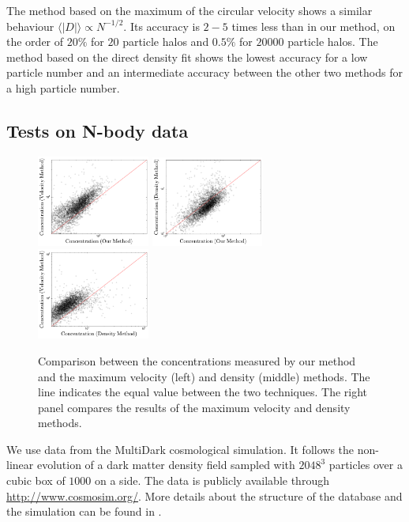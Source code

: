 \documentclass{emulateapj}
\newcommand{\avg}[1]{\langle{#1}\rangle}
\newcommand{\hMpc}{{\ifmmode{h^{-1}{\rm Mpc}}\else{$h^{-1}$Mpc }\fi}}
\begin{document}
The method based on the maximum of the circular velocity shows a similar
behaviour $\avg{|D|}\propto N^{-1/2}$. Its accuracy is $2-5$ times less
than in our method, on the order of $20\%$ for $20$ particle halos and
$0.5\%$ for $20000$ particle halos. The method based on the direct density
fit shows the lowest accuracy for a low particle number and an intermediate
accuracy between the other two methods for a high particle number.

\subsection{Tests on N-body data}
\label{sec:data}
\begin{figure}
  \begin{center}
    \includegraphics[width=0.33\textwidth]{mass-velocity.pdf}
    \includegraphics[width=0.33\textwidth]{mass-density.pdf}
    \includegraphics[width=0.33\textwidth]{density-velocity.pdf}
  \end{center}
  \caption{Comparison between the concentrations measured by our
    method and the maximum velocity (left) and density (middle)
    methods. The line indicates the equal value between the two
    techniques. The right panel compares the results of the maximum
    velocity and density methods.
  \label{fig:mdv}}
\end{figure}

We use data from the MultiDark cosmological simulation.
It follows the non-linear evolution of a dark matter density field
sampled with $2048^3$ particles over a cubic box of $1000$ \hMpc on a side.
The data is publicly available through \url{http://www.cosmosim.org/}.
More details about the structure of the database and the simulation
can be found in \citep{2013AN....334..691R}.
\end{document}
